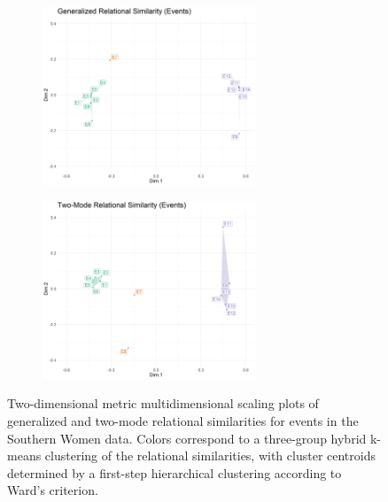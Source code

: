\documentclass[a4paper,fleqn]{cas-sc}
\begin{document}
\begin{figure}[ht!]
    \begin{subfigure}[b]{1.0\textwidth}
        \centering
        \includegraphics[width=0.7\textwidth]{Plots/grs-events-sw.png}
        \caption{}
        \label{fig:grs-events-sw}
    \end{subfigure} 
    \begin{subfigure}[b]{1.0\textwidth}
        \centering
        \includegraphics[width=0.7\textwidth]{Plots/tmrs-events-sw.png}
        \caption{}
        \label{fig:tmrs-events-sw}
    \end{subfigure} 
    \caption{Two-dimensional metric multidimensional scaling plots of generalized and two-mode relational similarities for events in the Southern Women data. Colors correspond to a three-group hybrid k-means clustering of the relational similarities, with cluster centroids determined by a first-step hierarchical clustering according to Ward's \citeyearpar{ward63} criterion.}
    \label{fig:events-sw}
\end{figure}
\end{document}
